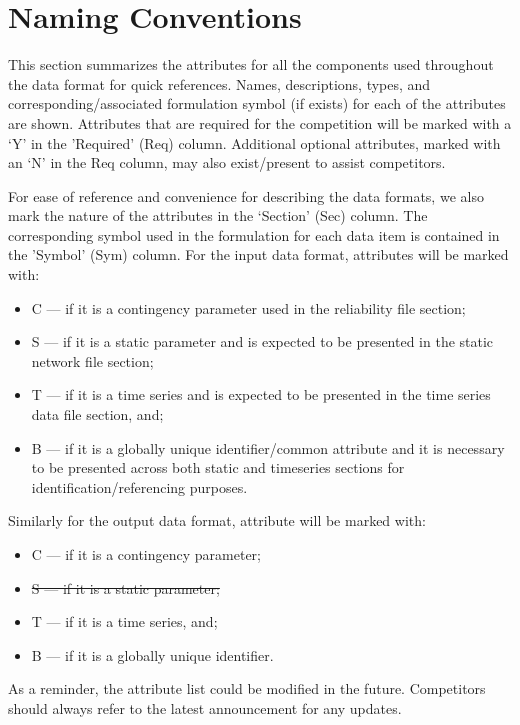 \documentclass{article}
\begin{document}
\section{Naming Conventions}
\label{sec:naming}
This section summarizes the attributes for all the components used throughout the data format for quick references.
Names, descriptions, types, and corresponding/associated formulation symbol (if exists) for each of the attributes are shown.
Attributes that are required for the competition
will be marked with a `Y' in the 'Required' (Req) column.
Additional optional attributes, marked with an `N' in the Req column, may also exist/present to assist competitors.

For ease of reference and convenience for describing the data formats, we also
mark the nature of the attributes in the `Section' (Sec) column. The corresponding symbol used in the formulation for each data item is contained in the 'Symbol' (Sym) column.
For the input data format, attributes will be marked with:
\begin{itemize}
\item C --- if it is a contingency parameter used in the reliability file section;
\item S --- if it is a static parameter and is expected to be presented in the static network file section;
\item T --- if it is a time series and is expected to be presented in the time series data file section, and;
\item B --- if it is a globally unique identifier/common attribute and it is necessary to be presented across both static and timeseries sections for identification/referencing purposes.  
\end{itemize}
Similarly for the output data format, attribute will be marked with:
\begin{itemize}
\item C --- if it is a contingency parameter;   
\item {\color{red} \sout{S --- if it is a static parameter;}}
\item T --- if it is a time series, and;
\item B --- if it is a globally unique identifier.
\end{itemize}
As a reminder, the attribute list could be modified in the future.
Competitors should always refer to the latest announcement for any
updates.
\end{document}
